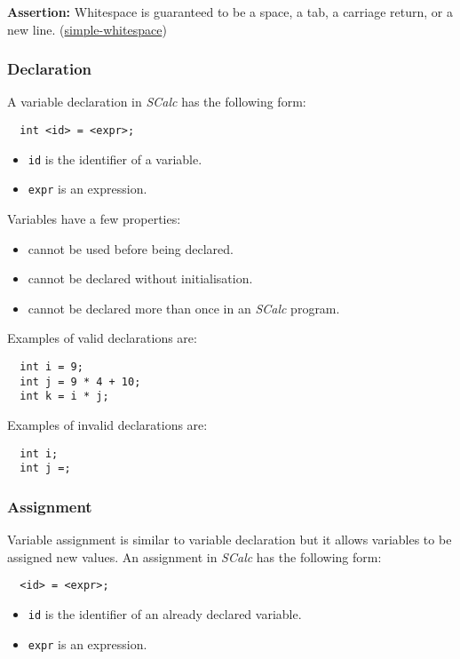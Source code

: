 \documentclass{article}
\newcommand{\code}[1]{\texttt{\textmd{#1}}}
\newcommand{\assertion}[2]{\textbf{Assertion: }#1 (\hyperlink{#2}{#2})}
\begin{document}
\assertion{Whitespace is guaranteed to be a space, a tab, a carriage return, or a new
line.}{simple-whitespace}

\subsubsection{Declaration}
\label{sssec:declaration}
A variable declaration in \textit{SCalc} has the following form:
\begin{lstlisting}
  int <id> = <expr>;
\end{lstlisting}

\begin{itemize}
  \item \code{id} is the identifier of a variable.
  \item \code{expr} is an expression.
\end{itemize}

Variables have a few properties:\hypertarget{variable-props}{}
\begin{itemize}
  \item cannot be used before being declared.
  \item cannot be declared without initialisation.
  \item cannot be declared more than once in an \textit{SCalc} program.
\end{itemize}

Examples of valid declarations are:
\begin{lstlisting}
  int i = 9;
  int j = 9 * 4 + 10;
  int k = i * j;
\end{lstlisting}

Examples of invalid declarations are:
\begin{lstlisting}
  int i;
  int j =;
\end{lstlisting}

\subsubsection{Assignment}
\label{sssec:assignment}
Variable assignment is similar to variable declaration but it allows variables to be assigned new
values. An assignment in \textit{SCalc} has the following form:
\begin{lstlisting}
  <id> = <expr>;
\end{lstlisting}

\begin{itemize}
  \item \code{id} is the identifier of an already declared variable.
  \item \code{expr} is an expression.
\end{itemize}
\end{document}
